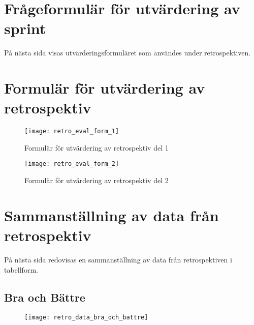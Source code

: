 \chapter{\hspace{2.6em} Frågeformulär för utvärdering av sprint}
\label{cha:team_utvardering}
På nästa sida visas utvärderingsformuläret som användes under retrospektiven.


\chapter{\hspace{2.6em} Formulär för utvärdering av retrospektiv}
\label{cha:retrospektiv_eval_form}

\begin{figure}[h]
  \centering
  \texttt{[image: retro\_eval\_form\_1]}
  \caption{Formulär för utvärdering av retrospektiv del 1}
\end{figure}

\begin{figure}[h]
  \centering
  \texttt{[image: retro\_eval\_form\_2]}
  \caption{Formulär för utvärdering av retrospektiv del 2}
\end{figure}

\chapter{\hspace{2.6em} Sammanställning av data från retrospektiv}
\label{cha:sammanstallning_av_data}
På nästa sida redovisas en sammanställning av data från retrospektiven i tabellform.


\section{Bra och Bättre}
\label{sec:bra_och_battre}
\begin{figure}[h]
  \centering
  \texttt{[image: retro\_data\_bra\_och\_battre]}
\end{figure}